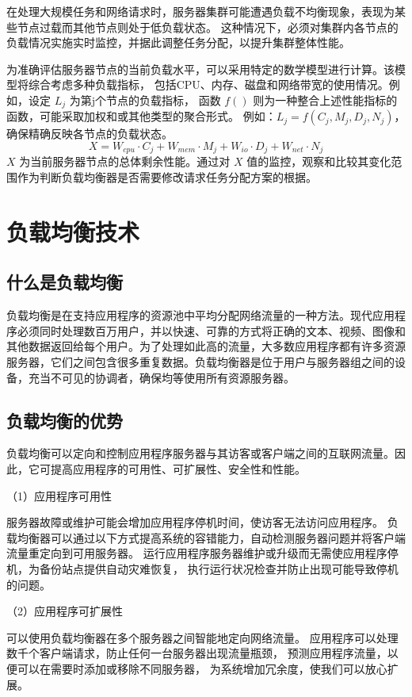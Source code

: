 在处理大规模任务和网络请求时，服务器集群可能遭遇负载不均衡现象，表现为某些节点过载而其他节点则处于低负载状态。
这种情况下，必须对集群内各节点的负载情况实施实时监控，并据此调整任务分配，以提升集群整体性能。

为准确评估服务器节点的当前负载水平，可以采用特定的数学模型进行计算。该模型将综合考虑多种负载指标，
包括CPU、内存、磁盘和网络带宽的使用情况。例如，设定 $L_{j}$ 为第j个节点的负载指标，
函数 $f()$ 则为一种整合上述性能指标的函数，可能采取加权和或其他类型的聚合形式。
例如：$L_{j} = f(C_{j}, M_{j}, D_{j}, N_{j})$，确保精确反映各节点的负载状态。
\[
	X = W_{cpu} \cdot C_j + W_{mem} \cdot M_j + W_{io} \cdot D_j + W_{net} \cdot N_j\tag{1.1}
\]
$X$ 为当前服务器节点的总体剩余性能。通过对 $X$ 值的监控，观察和比较其变化范围作为判断负载均衡器是否需要修改请求任务分配方案的根据。

\section{负载均衡技术}

\subsection{什么是负载均衡}

负载均衡是在支持应用程序的资源池中平均分配网络流量的一种方法。现代应用程序必须同时处理数百万用户，并以快速、可靠的方式将正确的文本、视频、图像和其他数据返回给每个用户。为了处理如此高的流量，大多数应用程序都有许多资源服务器，它们之间包含很多重复数据。负载均衡器是位于用户与服务器组之间的设备，充当不可见的协调者，确保均等使用所有资源服务器。

\subsection{负载均衡的优势}

负载均衡可以定向和控制应用程序服务器与其访客或客户端之间的互联网流量。因此，它可提高应用程序的可用性、可扩展性、安全性和性能。

（1）应用程序可用性

服务器故障或维护可能会增加应用程序停机时间，使访客无法访问应用程序。
负载均衡器可以通过以下方式提高系统的容错能力，自动检测服务器问题并将客户端流量重定向到可用服务器。
运行应用程序服务器维护或升级而无需使应用程序停机，为备份站点提供自动灾难恢复，
执行运行状况检查并防止出现可能导致停机的问题。

（2）应用程序可扩展性

可以使用负载均衡器在多个服务器之间智能地定向网络流量。
应用程序可以处理数千个客户端请求，防止任何一台服务器出现流量瓶颈，
预测应用程序流量，以便可以在需要时添加或移除不同服务器，
为系统增加冗余度，使我们可以放心扩展。

